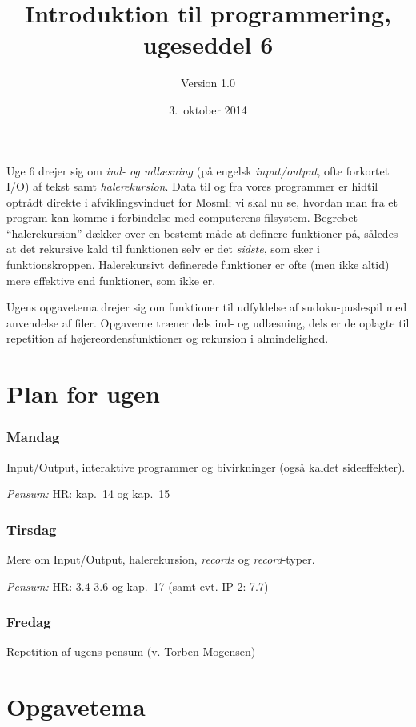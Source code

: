 \documentclass[a4paper]{article}
\title{Introduktion til programmering, ugeseddel 6}
\author{Version 1.0}
\date{3.\ oktober 2014}
\begin{document}
\maketitle

Uge 6 drejer sig om \emph{ind- og udl{\ae}sning} (p{\aa} engelsk \emph{input/output}, ofte forkortet I/O) af tekst
samt \emph{halerekursion}.  Data til og fra vores programmer er hidtil optr{\aa}dt direkte i afviklingsvinduet for Mosml;
vi skal nu se, hvordan man fra et program kan komme i forbindelse med computerens filsystem.
Begrebet ``halerekursion'' d{\ae}kker over en bestemt m{\aa}de at
definere funktioner p{\aa}, s{\aa}ledes at det rekursive kald til funktionen selv er det \emph{sidste}, som sker i funktionskroppen. Halerekursivt definerede funktioner
er ofte (men ikke altid) mere effektive end funktioner, som ikke er.

Ugens opgavetema drejer sig om funktioner til udfyldelse af sudoku-puslespil med anvendelse
af filer. Opgaverne tr{\ae}ner dels ind- og udl{\ae}sning,
 dels er de oplagte til repetition af h{\o}jereordensfunktioner og rekursion i almindelighed.

\section*{Plan for ugen}
\label{sec:pensum-og-plan}

\subsubsection*{Mandag}
Input/Output, interaktive programmer og bivirkninger (også kaldet sideeffekter).

\textit{Pensum:} HR: kap.\ 14 og kap.\ 15

\subsubsection*{Tirsdag}
Mere om Input/Output, halerekursion, \textit{records} og \textit{record}-typer.

\textit{Pensum:} HR: 3.4-3.6 og kap.\ 17 (samt evt. IP-2: 7.7)

\subsubsection*{Fredag}
Repetition af ugens pensum (v. Torben Mogensen)

\newpage
\section{Opgavetema}\label{sec:opgavetema}
\end{document}
